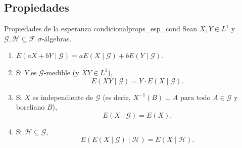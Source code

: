 \documentclass[11pt, a4paper]{article}
\begin{document}
\subsection{Propiedades}

\begin{proposicion}{Propiedades de la esperanza condicional}{props_esp_cond}
Sean $X, Y \in L^1$ y $\mathcal{G}, \mathcal{H} \subseteq \mathcal{F}$ $\sigma$-álgebras.
\begin{enumerate}
    \item $E(aX + bY \mid \mathcal{G}) = a E(X \mid \mathcal{G}) + b E(Y \mid \mathcal{G})$.
    \item Si $Y$ es $\mathcal{G}$-medible (y $XY \in L^1$),
    $$ E(XY \mid \mathcal{G}) = Y \cdot E(X \mid \mathcal{G}). $$
    \item Si $X$ es independiente de $\mathcal{G}$ (es decir, $X^{-1}(B) \perp A$ para todo $A \in
    \mathcal{G}$ y boreliano $B$),
    $$ E(X \mid \mathcal{G}) = E(X). $$
    \item Si $\mathcal{H} \subseteq \mathcal{G}$,
    $$ E(E(X \mid \mathcal{G}) \mid \mathcal{H}) = E(X \mid \mathcal{H}). $$
\end{enumerate}
\end{proposicion}
\end{document}
